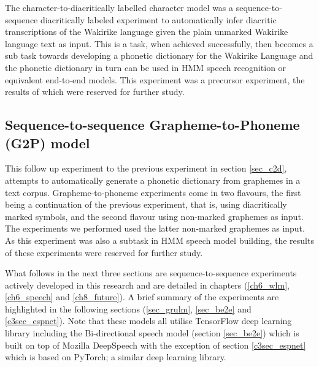 The character-to-diacritically labelled character model was a sequence-to-sequence diacritically labeled experiment to automatically infer diacritic transcriptions of the Wakirike language given the plain unmarked Wakirike language text as input.  This is a task, when achieved successfully, then becomes a sub task towards developing a phonetic dictionary for the Wakirike Language and the phonetic dictionary in turn can be used in HMM speech recognition or equivalent  end-to-end models.  This experiment was a precursor experiment, the results of which were reserved for further study.

\subsection{Sequence-to-sequence Grapheme-to-Phoneme (G2P) model}\label{sec_c3_g2p}
This follow up experiment to the previous experiment in section \ref{sec_c2d},  attempts to automatically generate a phonetic dictionary from graphemes in a text corpus. Grapheme-to-phoneme experiments come in two flavours, the first being a continuation of the previous experiment, that is, using diacritically marked symbols, and the second flavour using non-marked graphemes as input.  The experiments we performed used the latter non-marked graphemes as input. As this experiment was also a subtask in HMM speech model building,  the results of these experiments were reserved for further study.

What follows in the next three sections are sequence-to-sequence experiments actively developed in this research and are detailed in chapters (\ref{ch6_wlm},\ref{ch6_speech} and \ref{ch8_future}).  A brief summary of the experiments are highlighted in the following sections (\ref{sec_grulm}, \ref{sec_be2e} and \ref{c3sec_espnet}).  Note that these models all utilise TensorFlow deep learning library including the Bi-directional speech model (section \ref{sec_be2e}) which is built on top of Mozilla DeepSpeech with the exception of section \ref{c3sec_espnet} which is based on PyTorch; a similar deep learning library.

